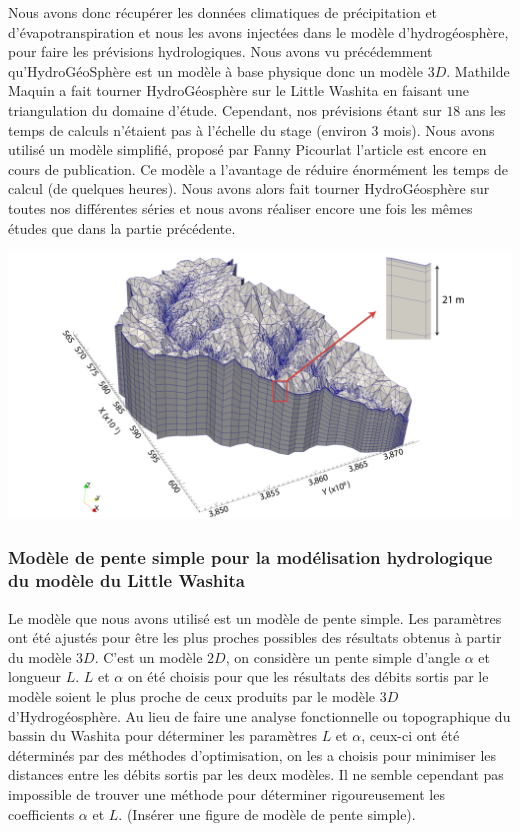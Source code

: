 \documentclass[a4paper,11pt]{article}
\begin{document}
Nous avons donc récupérer les données climatiques de précipitation et d'évapotranspiration et nous les avons injectées dans le modèle d'hydrogéosphère, pour faire les prévisions hydrologiques. Nous avons vu précédemment qu'HydroGéoSphère est un modèle à base physique donc un modèle $3D$. Mathilde Maquin a fait tourner HydroGéosphère sur le Little Washita en faisant une triangulation du domaine d'étude. Cependant, nos prévisions étant sur $18$ ans les temps de calculs n'étaient pas à l'échelle du stage (environ 3 mois). Nous avons utilisé un modèle simplifié, proposé par Fanny Picourlat l'article est encore en cours de publication. Ce modèle a l'avantage de réduire énormément les temps de calcul (de quelques heures). Nous avons alors fait tourner HydroGéosphère sur toutes nos différentes séries et nous avons réaliser encore une fois les mêmes études que dans la partie précédente.

  
\begin{center}
	\captionsetup{type=figure}
	\includegraphics[scale=0.2]{images/little_washita3D.png}
\end{center}


\subsubsection{Modèle de pente simple pour la modélisation hydrologique du modèle du Little Washita}

Le modèle que nous avons utilisé est un modèle de pente simple. Les paramètres ont été ajustés pour être les plus proches possibles des résultats obtenus à partir du modèle $3D$. C'est un modèle $2D$, on considère un pente simple d'angle $\alpha$ et longueur $L$. $L$ et $\alpha$ on été choisis pour que les résultats des débits sortis par le modèle soient le plus proche de ceux produits par le modèle $3D$ d'Hydrogéosphère. Au lieu de faire une analyse fonctionnelle ou topographique du bassin du Washita pour déterminer les paramètres $L$ et $\alpha$, ceux-ci ont été déterminés par des méthodes d'optimisation, on les a choisis pour minimiser les distances entre les débits sortis par les deux modèles. Il ne semble cependant pas impossible de trouver une méthode pour déterminer rigoureusement les coefficients $\alpha$ et $L$. (Insérer une figure de modèle de pente simple).     
\end{document}
